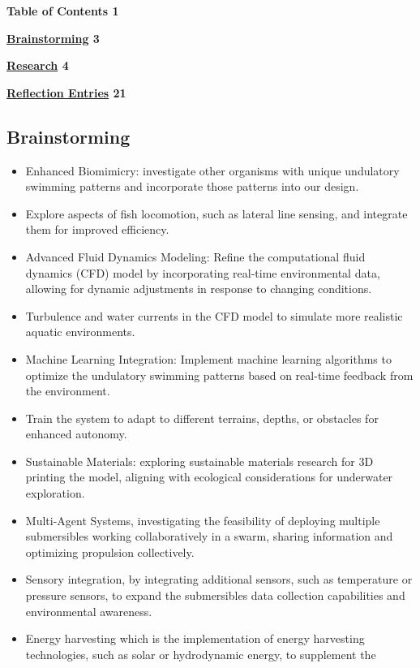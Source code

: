 \textbf{Table of Contents 1}

\textbf{\hyperref[brainstorming]{Brainstorming} 3}

\textbf{\hyperref[research]{Research} 4}


\textbf{\hyperref[section-2]{Reflection Entries} 21}


\subsection{Brainstorming}\label{brainstorming}

\begin{itemize}
\item
  Enhanced Biomimicry: investigate other organisms with unique
  undulatory swimming patterns and incorporate those patterns into our
  design.
\item
  Explore aspects of fish locomotion, such as lateral line sensing, and
  integrate them for improved efficiency.
\item
  Advanced Fluid Dynamics Modeling: Refine the computational fluid
  dynamics (CFD) model by incorporating real-time environmental data,
  allowing for dynamic adjustments in response to changing conditions.
\item
  Turbulence and water currents in the CFD model to simulate more
  realistic aquatic environments.
\item
  Machine Learning Integration: Implement machine learning algorithms to
  optimize the undulatory swimming patterns based on real-time feedback
  from the environment.
\item
  Train the system to adapt to different terrains, depths, or obstacles
  for enhanced autonomy.
\item
  Sustainable Materials: exploring sustainable materials research for 3D
  printing the model, aligning with ecological considerations for
  underwater exploration.
\item
  Multi-Agent Systems, investigating the feasibility of deploying
  multiple submersibles working collaboratively in a swarm, sharing
  information and optimizing propulsion collectively.
\item
  Sensory integration, by integrating additional sensors, such as
  temperature or pressure sensors, to expand the
  submersible\textquotesingle s data collection capabilities and
  environmental awareness.
\item
  Energy harvesting which is the implementation of energy harvesting
  technologies, such as solar or hydrodynamic energy, to supplement the

\end{itemize}
